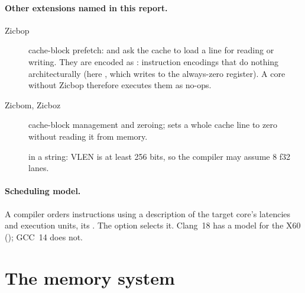 \paragraph{Other extensions named in this report.}
\begin{description}
  \item[Zicbop] cache-block prefetch:  and  ask the cache to
        load a line for reading or writing. They are encoded as : instruction
        encodings that do nothing architecturally (here , which writes to
        the always-zero register). A core without Zicbop therefore executes them as no-ops.
  \item[Zicbom, Zicboz] cache-block management and zeroing;  sets a whole
        cache line to zero without reading it from memory.
  \item[] in a  string: VLEN is at least 256 bits, so the compiler
        may assume 8 f32 lanes.
\end{description}

\paragraph{Scheduling model.} A compiler orders instructions using a description of the target
core's latencies and execution units, its . The option
 selects it. Clang~18 has a model for the X60
(); GCC~14 does not.

\section{The memory system}\label{r03:sec:bg-mem}

